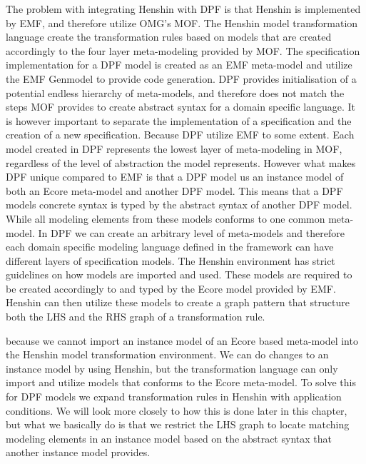 The problem with integrating Henshin with DPF is that Henshin is implemented by
EMF, and therefore utilize OMG's MOF. The Henshin model transformation
language create the transformation rules based on models that are created
accordingly to the four layer meta-modeling provided by MOF. The
specification implementation for a DPF model is created as an EMF meta-model 
and utilize the EMF Genmodel to provide code generation. DPF provides
initialisation of a potential endless hierarchy of meta-models, and therefore
does not match the steps MOF provides to create abstract syntax for a domain
specific language. It is however important to separate the implementation of a
specification and the creation of a new specification. Because DPF utilize EMF
to some extent. Each model created in DPF represents the lowest layer of
meta-modeling in MOF, regardless of the level of abstraction the model
represents. However what makes DPF unique compared to EMF is that a DPF model us
an instance model of both an Ecore meta-model and another DPF model. This means
that a DPF models concrete syntax is typed by the abstract syntax of another DPF
model. While all modeling elements from these models conforms to one common
meta-model. In DPF we can create an arbitrary level of meta-models and therefore
each domain specific modeling language defined in the framework can have
different layers of specification models. The Henshin environment has strict
guidelines on how models are imported and used. These models are required to be
created accordingly to and typed by the Ecore model provided by EMF. Henshin
can then utilize these models to create a graph pattern that structure both the
LHS and the RHS graph of a transformation rule.

 because we cannot import an instance model of
an Ecore based meta-model into the Henshin model transformation environment. We
can do changes to an instance model by using Henshin, but the transformation
language can only import and utilize models that conforms to the Ecore
meta-model. To solve this for DPF models we expand transformation rules in
Henshin with application conditions. We will look more closely to how this is
done later in this chapter, but what we basically do is that we restrict the
LHS graph to locate matching modeling elements in an instance model based on
the abstract syntax that another instance model provides.



